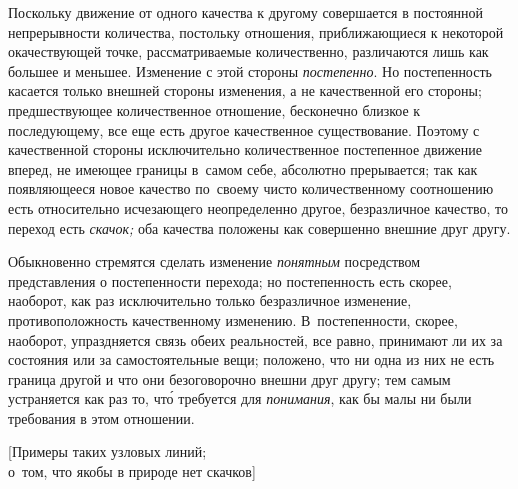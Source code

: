 Поскольку движение от одного качества к другому совершается в постоянной
непрерывности количества, постольку отношения, приближающиеся к некоторой
окачествующей точке, рассматриваемые количественно, различаются лишь как
большее и меньшее. Изменение с этой стороны {\em постепенно}. Но постепенность
касается только внешней стороны изменения, а не качественной его стороны;
предшествующее количественное отношение, бесконечно близкое к последующему,
все еще есть другое качественное существование. Поэтому с качественной стороны
исключительно количественное постепенное движение вперед, не имеющее границы
в~самом себе, абсолютно прерывается; так как появляющееся новое качество
по~своему чисто количественному соотношению есть относительно исчезающего
неопределенно другое, безразличное качество, то переход есть {\em скачок;}
оба качества положены как совершенно внешние друг другу.

Обыкновенно стремятся сделать изменение {\em понятным} посредством
представления о постепенности перехода; но постепенность есть скорее, наоборот,
как раз исключительно только безразличное изменение, противоположность
качественному изменению. В~постепенности, скорее, наоборот, упраздняется связь
обеих реальностей, все равно, принимают ли их за состояния или за
самостоятельные вещи; положено, что ни одна из них не есть граница другой и что
они безоговорочно внешни друг другу; тем самым устраняется как раз то, чт\'{о}
требуется для {\em понимания}, как бы малы ни были требования в этом отношении.

%
{[Примеры таких узловых линий;\\о~том, что якобы в природе нет скачков]}


